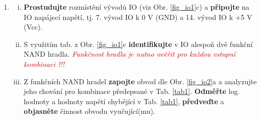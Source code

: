 \documentclass[a4paper, 11pt]{report}
\newcommand\dangersign[1][2ex]{%
  \renewcommand\stacktype{L}%
  \scaleto{\stackon[1.3pt]{\color{red}$\triangle$}{\tiny\bfseries !}}{#1}%
}
\begin{document}
\begin{enumerate}[\bf {Experiment} 1:]

\item 
\begin{enumerate}[i)]
\item
{\bf Prostudujte} rozmístění vývodů IO (viz Obr. \ref{fig_io1}c) 
a 
{\bf připojte} na IO napájecí napětí, tj. 7. vývod IO k 0 V (GND) a 14. vývod IO k +5 V (Vcc). 

\item 
\parbox{125mm}{
S využitím tab. z Obr. \ref{fig_io1}c {\bf identifikujte} v IO alespoň dvě funkční NAND hradla.
\textcolor{red}{
\it Funkčnost hradla je nutno ověřit pro každou vstupní kombinaci !!!}
}
\parbox{5mm}{
\dangersign[5ex]\par
} 

\item
Z funkčních NAND hradel 
{\bf zapojte} obvod dle Obr. \ref{fig_io2}a a analyzujte jeho chování
pro kombinace předepsané v  
Tab. \ref{tab1}.
{\bf Odměřte} log. hodnoty a hodnoty napětí chybějící v Tab. \ref{tab1}, 
{\bf předveďte} a {\bf objasněte} činnost obvodu vyučující(mu).



\end{enumerate}

\vspace{-1mm}
\begin{table}[h]
\centering
{}
\end{table}
\end{enumerate}
\end{document}
